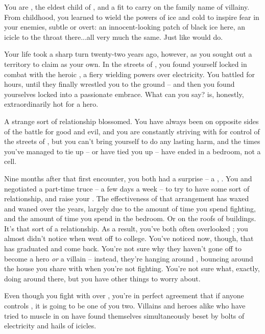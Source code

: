 \documentclass[char]{LRSguildcamp1}
\begin{document}
\name{\cOldest{}}

You are \cOldest{\intro}, the eldest child of \cGrandma{\intro}, and a \cOldest{\offspring} fit to carry on the family name of villainy.  
From childhood, you learned to wield the powers of ice and cold to inspire fear in your enemies, subtle or overt: an innocent-looking patch of black ice here, an icicle to the throat there...all very much the same.  Just like \cGrandma{\Parent} would do.


Your life took a sharp turn twenty-two years ago, however, as you sought out a territory to claim as your own.  In the streets of \pCityO{}, you found yourself locked in combat with the heroic \cOS{\intro}, a fiery \cOS{\hero} wielding powers over electricity.  You battled for hours, until they finally wrestled you to the ground -- and then you found yourselves locked into a passionate embrace.  What can you say?  \cOS{} is, honestly, extraordinarily hot for a hero.

A strange sort of relationship blossomed.  You have always been on opposite sides of the battle for good and evil, and you are constantly striving with \cOS{\them} for control of the streets of \pCityO{}, but you can't bring yourself to do \cOS{\them} any lasting harm, and the times you've managed to tie \cOS{\them} up -- or \cOS{\they} have tied you up -- have ended in a bedroom, not a cell.

Nine months after that first encounter, you both had a surprise -- a \cGrad{\offspring}, \cGrad{\intro}.  You and \cOS{} negotiated a part-time truce -- a few days a week -- to try to have some sort of relationship, and raise your \cGrad{\offspring}.  The effectiveness of that arrangement has waxed and waned over the years, largely due to the amount of time you spend fighting, and the amount of time you spend in the bedroom.  Or on the roofs of buildings.  It's that sort of a relationship.  As a result, you've both often overlooked \cGrad{}; you almost didn't notice when \cGrad{} went off to college.  You've noticed now, though, that \cGrad{} has graduated and come back.  You're not sure why they haven't gone off to become a hero \emph{or} a villain -- instead, they're hanging around \pCityO{}, bouncing around the house you share with \cOS{} when you're not fighting.  You're not sure what, exactly, \cGrad{\theyare} doing around there, but you have other things to worry about.

Even though you fight with \cOS{} over \pCityO{}, you're in perfect agreement that if anyone controls \pCityO{}, it is going to be one of you two.  Villains and heroes alike who have tried to muscle in on \pCityO{} have found themselves simultaneously beset by bolts of electricity and hails of icicles.
\end{document}

